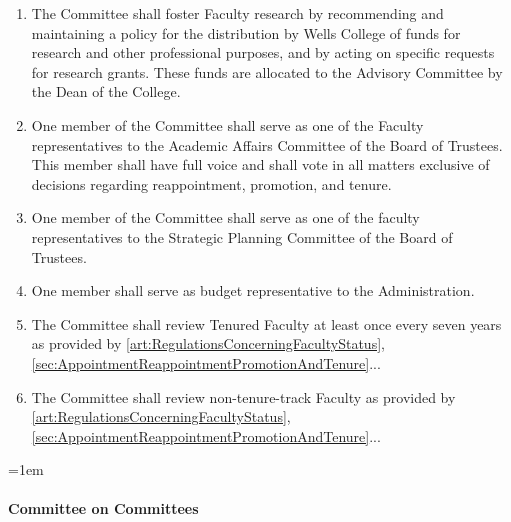 \documentclass{manual}
\let\oldparagraph\paragraph
\renewcommand\paragraph{\leftskip=1em\oldparagraph}
\newcommand{\itemLevelA}{\alph*.}
\newcommand{\itemLevelB}{\arabic*)}
\newcommand{\itemRefA}{\alph*}
\newcommand{\itemRefB}{\arabic*}
\begin{document}
\begin{enumerate}[label=\itemLevelA,ref=\itemRefA]
\begin{enumerate}[label=\itemLevelB,ref=\itemRefB]
					\item The Committee shall foster Faculty research by recommending and maintaining a policy for the distribution by Wells College of funds for research and other professional purposes, and by acting on specific requests for research grants. These funds are allocated to the Advisory Committee by the Dean of the College.
					\item One member of the Committee shall serve as one of the Faculty representatives to the Academic Affairs Committee of the Board of Trustees. This member shall have full voice and shall vote in all matters exclusive of decisions regarding reappointment, promotion, and tenure.
					\item One member of the Committee shall serve as one of the faculty representatives to the Strategic Planning Committee of the Board of Trustees.
					\item One member shall serve as budget representative to the Administration.
					\item The Committee shall review Tenured Faculty at least once every seven years as provided by \cref{art:RegulationsConcerningFacultyStatus}, \cref{sec:AppointmentReappointmentPromotionAndTenure}...
					\item The Committee shall review non-tenure-track Faculty as provided by \cref{art:RegulationsConcerningFacultyStatus}, \cref{sec:AppointmentReappointmentPromotionAndTenure}...
					\end{enumerate}

				\end{enumerate}

			\paragraph{Committee on Committees}
\end{document}
